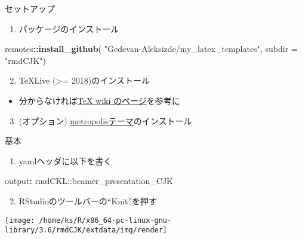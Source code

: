 \documentclass[
  12pt,
  ignorenonframetext,
]{beamer}
\newenvironment{Shaded}{\begin{snugshade}}{\end{snugshade}}
\newcommand{\AttributeTok}[1]{\textcolor[rgb]{0.77,0.63,0.00}{#1}}
\newcommand{\DataTypeTok}[1]{\textcolor[rgb]{0.13,0.29,0.53}{#1}}
\newcommand{\FunctionTok}[1]{\textcolor[rgb]{0.00,0.00,0.00}{#1}}
\newcommand{\KeywordTok}[1]{\textcolor[rgb]{0.13,0.29,0.53}{\textbf{#1}}}
\newcommand{\NormalTok}[1]{#1}
\newcommand{\OperatorTok}[1]{\textcolor[rgb]{0.81,0.36,0.00}{\textbf{#1}}}
\newcommand{\StringTok}[1]{\textcolor[rgb]{0.31,0.60,0.02}{#1}}
\providecommand{\tightlist}{%
  \setlength{\itemsep}{0pt}\setlength{\parskip}{0pt}}
\begin{document}
\begin{frame}[fragile]{セットアップ}
\protect\hypertarget{ux30bbux30c3ux30c8ux30a2ux30c3ux30d7}{}

\begin{enumerate}
\tightlist
\item
  パッケージのインストール
\end{enumerate}

\begin{Shaded}
\begin{Highlighting}[]
\NormalTok{remotes}\OperatorTok{::}\KeywordTok{install_github}\NormalTok{(}
  \StringTok{"Gedevan-Aleksizde/my_latex_templates"}\NormalTok{,}
  \DataTypeTok{subdir =} \StringTok{"rmdCJK"}\NormalTok{)}
\end{Highlighting}
\end{Shaded}

\begin{enumerate}
\setcounter{enumi}{1}
\tightlist
\item
  TeXLive (\textgreater= 2018)のインストール
\end{enumerate}

\begin{itemize}
\tightlist
\item
  分からなければ\href{https://texwiki.texjp.org/?TeX\%20Live}{TeX wiki
  のページ}を参考に
\end{itemize}

\begin{enumerate}
\setcounter{enumi}{2}
\tightlist
\item
  (オプション)
  \href{https://github.com/matze/mtheme}{metropolisテーマ}のインストール
\end{enumerate}

\end{frame}

\begin{frame}[fragile]{基本}
\protect\hypertarget{ux57faux672c}{}

\begin{enumerate}
\tightlist
\item
  yamlヘッダに以下を書く
\end{enumerate}

\begin{Shaded}
\begin{Highlighting}[]
\FunctionTok{output}\KeywordTok{:}\AttributeTok{  rmdCKL::beamer_presentation_CJK}
\end{Highlighting}
\end{Shaded}

\begin{enumerate}
\setcounter{enumi}{1}
\tightlist
\item
  RStudioのツールバーの``Knit''を押す
\end{enumerate}

\begin{center}\texttt{[image: /home/ks/R/x86\_64-pc-linux-gnu-library/3.6/rmdCJK/extdata/img/render]} \end{center}

\end{frame}
\end{document}
